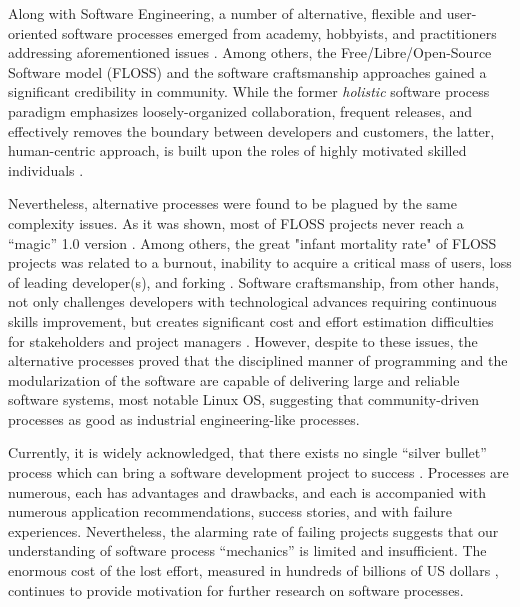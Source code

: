 Along with Software Engineering, a number of alternative, flexible and user-oriented software processes 
emerged from academy, hobbyists, and practitioners addressing aforementioned issues \cite{citeulike:3729379}. 
Among others, the Free/Libre/Open-Source Software model (FLOSS) and the software craftsmanship  
approaches gained a significant credibility in community. 
While the former \textit{holistic} software process paradigm emphasizes loosely-organized 
collaboration, frequent releases, and effectively removes the boundary between developers 
and customers, the latter, human-centric approach, is built upon the roles of highly 
motivated skilled individuals \cite{citeulike:262020} \cite{citeulike:2759198}. 

Nevertheless, alternative processes were found to be plagued by the same complexity issues. 
As it was shown, most of FLOSS projects never reach a ``magic'' 1.0 version \cite{citeulike:12480029}. 
Among others, the great "infant mortality rate" of FLOSS projects was related to a burnout, 
inability to acquire a critical mass of users, loss of leading developer(s), and forking \cite{richter2007critique}. 
Software craftsmanship, from other hands, not only challenges developers with technological advances 
requiring continuous skills improvement, but creates significant cost and effort estimation difficulties for
stakeholders and project managers \cite{citeulike:11058784}. However, despite to these issues, 
the alternative processes proved that the disciplined manner of programming and the modularization  
of the software are capable of delivering large and reliable software systems, most notable Linux OS,
suggesting that community-driven processes as good as industrial engineering-like processes.

Currently, it is widely acknowledged, that there exists no single ``silver bullet'' process which 
can bring a software development project to success \cite{citeulike:1986013}. 
Processes are numerous, each has advantages and drawbacks, and each is accompanied with 
numerous application recommendations, success stories, and with failure experiences. Nevertheless,
the alarming rate of failing projects suggests that our understanding of software process ``mechanics''  
is limited and insufficient\cite{citeulike:12550665}. 
The enormous cost of the lost effort, measured in hundreds of billions of US dollars 
\cite{citeulike:2207657} \cite{citeulike:2207653} \cite{citeulike:2207655}, 
continues to provide motivation for further research on software processes. 

